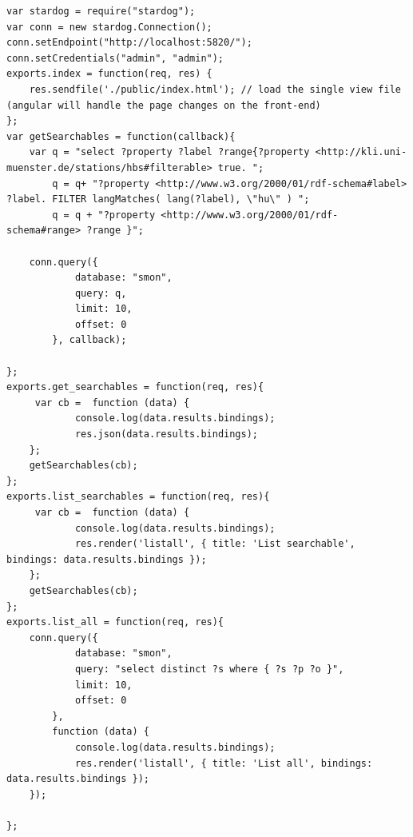  \newpage
 \begin{lstlisting}[caption={Code for the RDF parser\label{fig:rdfprs}}]
var stardog = require("stardog");
var conn = new stardog.Connection();
conn.setEndpoint("http://localhost:5820/");
conn.setCredentials("admin", "admin");
exports.index = function(req, res) {
	res.sendfile('./public/index.html'); // load the single view file (angular will handle the page changes on the front-end)
};
var getSearchables = function(callback){
	var q = "select ?property ?label ?range{?property <http://kli.uni-muenster.de/stations/hbs#filterable> true. ";
		q = q+ "?property <http://www.w3.org/2000/01/rdf-schema#label> ?label. FILTER langMatches( lang(?label), \"hu\" ) ";
		q = q + "?property <http://www.w3.org/2000/01/rdf-schema#range> ?range }"; 
	
	conn.query({ 
	        database: "smon", 
	        query: q,  
	        limit: 10, 
	        offset: 0 
	    }, callback);
	
};
exports.get_searchables = function(req, res){
	 var cb =  function (data) {
	        console.log(data.results.bindings);
	        res.json(data.results.bindings);
	};
	getSearchables(cb);  
};
exports.list_searchables = function(req, res){
	 var cb =  function (data) {
	        console.log(data.results.bindings);
	        res.render('listall', { title: 'List searchable', bindings: data.results.bindings });
	};
	getSearchables(cb);  
};
exports.list_all = function(req, res){
	conn.query({ 
	        database: "smon", 
	        query: "select distinct ?s where { ?s ?p ?o }",  
	        limit: 10, 
	        offset: 0 
	    },
	    function (data) {
	        console.log(data.results.bindings);
	        res.render('listall', { title: 'List all', bindings: data.results.bindings });
	});
  
};
 \end{lstlisting}
 
 \newpage
 
